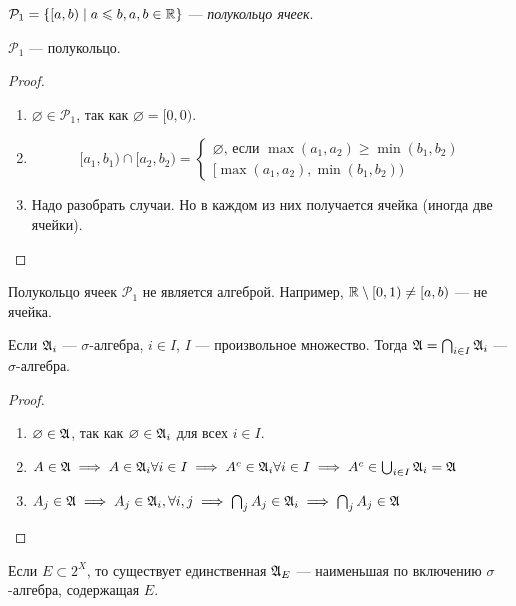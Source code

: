\begin{df}
 $ \mathcal{P}_1 = \left\{ [a, b) \mid a \leqslant b, a, b \in \mathbb{R} \right\} $ --- \textit{полукольцо ячеек}.
\end{df}
\begin{lm}
 $ \mathcal{P}_1 $ --- полукольцо.
\end{lm}
\begin{proof}\
 \begin{enumerate}
  \item $ \varnothing \in \mathcal{P_1} $, так как $ \varnothing = [0, 0) $.
  \item $$
   [a_1, b_1) \cap [a_2, b_2) = 
   \begin{cases}
    \varnothing \text{, если } \max(a_1, a_2) \geqslant \min(b_1, b_2) \\
    [\max(a_1, a_2), \min(b_1, b_2) )
   \end{cases}
   $$
  \item Надо разобрать случаи. Но в каждом из них получается ячейка (иногда две ячейки).
 \end{enumerate}
\end{proof}
\begin{remrk}
 Полукольцо ячеек $ \mathcal{P}_1 $ не является алгеброй. Например, $ \mathbb{R} \setminus [0, 1) \neq [a, b)$ --- не ячейка.
\end{remrk}
\begin{lm}
 Если $ \mathfrak{A}_i $ --- $ \sigma $-алгебра, $ i \in I $, $ I $ --- произвольное множество. Тогда $ \mathfrak{A} = \bigcap_{i \in I} \mathfrak{A}_i $ --- $ \sigma $-алгебра.
\end{lm}
\begin{proof}\
 \begin{enumerate}
  \item $ \varnothing \in \mathfrak{A} $, так как $ \varnothing \in \mathfrak{A}_i $ для всех $ i \in I $.
  \item $ A \in \mathfrak{A} \;\Longrightarrow\; A \in \mathfrak{A}_i  \forall i \in I \;\Longrightarrow\; A^c \in \mathfrak{A}_i \forall i \in I \;\Longrightarrow\; A^c \in \bigcup_{i \in I} \mathfrak{A}_i = \mathfrak{A}$ 
  \item $ A_j \in \mathfrak{A} \;\Longrightarrow\; A_j \in \mathfrak{A}_i, \forall i, j  \;\Longrightarrow\; \bigcap_j A_j \in 
  \mathfrak{A}_i \;\Longrightarrow\; \bigcap_j A_j \in \mathfrak{A}$
 \end{enumerate}
\end{proof}
\begin{lm}
 Если $ E \subset 2^X $, то существует единственная $ \mathfrak{A}_E $ --- наименьшая по включению $ \sigma $-алгебра, содержащая $ E $.
\end{lm}
